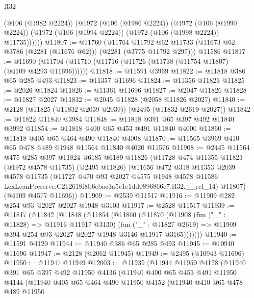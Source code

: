 \begin{lexlean}{R32}
\begin{coremodule}
        (@106 (@1982 @2224))
        (@1972
          (@106 (@1986 @2224))
          (@1972
            (@106 (@1990 @2224))
            (@1972 (@106 (@1994 @2224)) (@1972 (@106 (@1998 @2224)) @11735))))))
@11807 := @11760
    (@11764 @11792 @62 @11733 (@11673 @62 @3786 (@2281 (@11676 @62))) (@2281 (@3775 @11792 @297)))
    @11586
@11817 := @11690 (@11704 (@11710 (@11716 (@11726 (@11738 (@11754 @11807) (@4109 @4293 @11696))))))
@11818 := @11591 @3969
@11822 := @11818 @386 @65 @285 @493
@11823 := @11357 @11696
@11824 := @11356 @11823
@11825 := @2026 @11824
@11826 := @11361 @11696
@11827 := @2047 @11826
@11828 := @11827 @2027
@11832 := @2045 @11828 (@2058 @11826 @2027)
@11840 := @2128 (@11825 (@11832 @2039 @2039)) (@2495 (@11832 @2619 @2027))
@11842 := @11822 @11840 @3984
@11848 := @11818 @391 @65 @397 @492 @11840 @3992
@11854 := @11818 @400 @65 @453 @491 @11840 @4000
@11860 := @11818 @405 @65 @464 @490 @11840 @4008
@11870 := @11565 @3969 @410 @65 @478 @489 @1948 @11564 @11840 @4020 @11576
@11908 := @2445
    @11564
    @475
    @285
    @397
    @11824
    @6185
    @6189
    @11826
    (@11728
      @474
      @11355
      @11823
      (@1972 @4578 @11735)
      (@2495 @11826)
      (@11656
        @472
        @318
        @11353
        @2039
        @4578
        @11735
        (@11727
          @470
          @93
          @2027
          @4575
          @1948
          @4578
          @11586
          LexLeanPreserve.C212618f8b6ebac3a5c1e1dd0896866e7.R32.__rel_14)
        @11807)
      (@4109 @4577 @11696))
@11909 := @2539 @11517
@11916 := @11909 @282 @254 @93 @2027 @2027 @1948 @3103
@11917 := @2528 @11517
@11939 := @11817
    (@11842
      (@11848
        (@11854
          (@11860
            (@11870
              (@11908
                (fun ("_" : @11828) => @11916 @11917 @3130)
                (fun ("_" : @11827 @2619) =>
                @11909 @394 @254 @93 @2027 @2027 @1948 @3146 @11917 @3165)))))))
@11940 := @11591 @4120
@11944 := @11940 @386 @65 @285 @493
@11945 := @10940 @11696
@11947 := @2128 (@2062 @11945)
@11949 := @2495 (@10943 @11696)
@11950 := @11947 @11949
@12003 := @11939
    (@11944
      @11950
      @4128
      (@11940
        @391
        @65
        @397
        @492
        @11950
        @4136
        (@11940
          @400
          @65
          @453
          @491
          @11950
          @4144
          (@11940
            @405
            @65
            @464
            @490
            @11950
            @4152
            (@11940
              @410
              @65
              @478
              @489
              @11950

\end{coremodule}
\end{lexlean}
